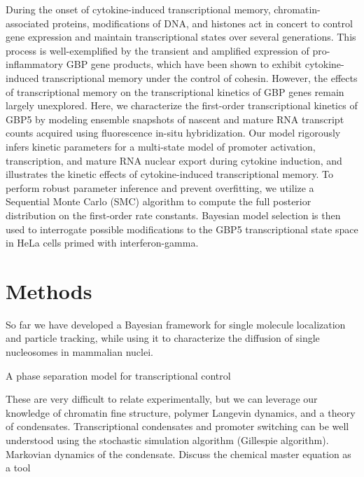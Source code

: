 \documentclass{article}
\begin{document}
During the onset of cytokine-induced transcriptional memory, chromatin-associated proteins, modifications of DNA, and histones act in concert to control gene expression and maintain transcriptional states over several generations. This process is well-exemplified by the transient and amplified expression of pro-inflammatory GBP gene products, which have been shown to exhibit cytokine-induced transcriptional memory under the control of cohesin. However, the effects of transcriptional memory on the transcriptional kinetics of GBP genes remain largely unexplored. Here, we characterize the first-order transcriptional kinetics of GBP5 by modeling ensemble snapshots of nascent and mature RNA transcript counts acquired using fluorescence in-situ hybridization. Our model rigorously infers kinetic parameters for a multi-state model of promoter activation, transcription, and mature RNA nuclear export during cytokine induction, and illustrates the kinetic effects of cytokine-induced transcriptional memory. To perform robust parameter inference and prevent overfitting, we utilize a Sequential Monte Carlo (SMC) algorithm to compute the full posterior distribution on the first-order rate constants. Bayesian model selection is then used to interrogate possible modifications to the GBP5 transcriptional state space in HeLa cells primed with interferon-gamma. 

 

\section{Methods}

 
So far we have developed a Bayesian framework for single molecule localization and particle tracking, while using it to characterize the diffusion of single nucleosomes in mammalian nuclei. 

 

A phase separation model for transcriptional control 

These are very difficult to relate experimentally, but we can leverage our knowledge of chromatin fine structure, polymer Langevin dynamics, and a theory of condensates. Transcriptional condensates and promoter switching can be well understood using the stochastic simulation algorithm (Gillespie algorithm). Markovian dynamics of the condensate. Discuss the chemical master equation as a tool \cite{Schaffter2011}

 



 
\end{document}
